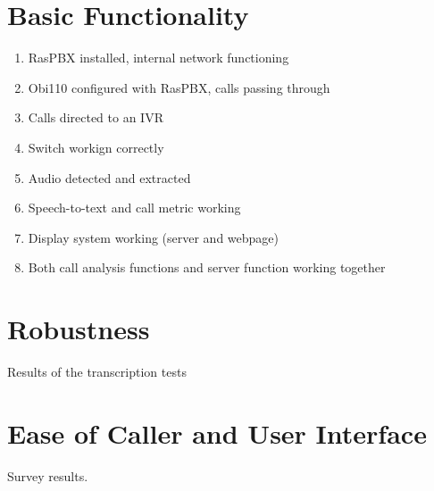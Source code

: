 \documentclass[main.tex]{subfiles}
\begin{document}
\section{Basic Functionality}

\begin{enumerate}
	\item RasPBX installed, internal network functioning
	\item Obi110 configured with RasPBX, calls passing through
	\item Calls directed to an IVR
	\item Switch workign correctly
	\item Audio detected and extracted
	\item Speech-to-text and call metric working
	\item Display system working (server and webpage)
	\item Both call analysis functions and server function working together
\end{enumerate}

\section{Robustness}
Results of the transcription tests

\section{Ease of Caller and User Interface}
Survey results. 
\end{document}
